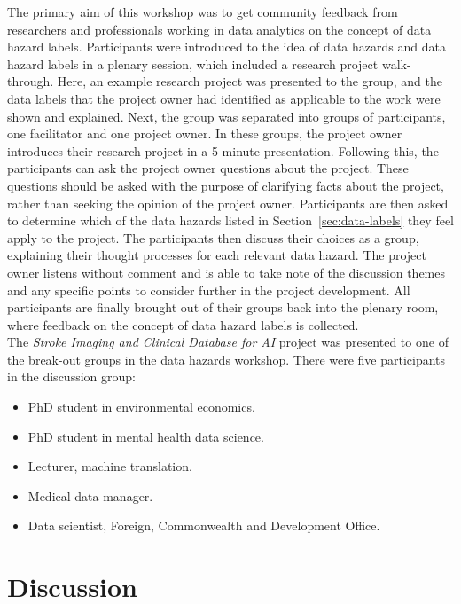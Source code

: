 \documentclass{article}
\begin{document}
The primary aim of this workshop was to get community feedback from
researchers and professionals working in data analytics on the concept
of data hazard labels.
Participants were introduced to the idea of data hazards and data
hazard labels in a plenary session, which included a research project
walk-through. Here, an example research project was presented to the
group, and the data labels that the project owner had identified as
applicable to the work were shown and explained.
Next, the group was separated into groups of participants, one
facilitator and one project owner.
In these groups, the project owner introduces their research project
in a 5 minute presentation. Following this, the participants can ask
the project owner questions about the project. These questions should
be asked with the purpose of clarifying facts about the project,
rather than seeking the opinion of the project owner.
Participants are then asked to determine which of the data hazards
listed in Section~\ref{sec:data-labels} they feel apply to the
project. The participants then discuss their choices as a group,
explaining their thought processes for each relevant data hazard.
The project owner listens without comment and is able to take note of
the discussion themes and any specific points to consider further in
the project development. All participants are finally brought out of
their groups back into the plenary room, where feedback on the concept
of data hazard labels is collected. \\

The \textit{Stroke Imaging and Clinical Database for AI} project was
presented to one of the break-out groups in the data hazards workshop.
There were five participants in the discussion group:

\begin{itemize}
\item PhD student in environmental economics.
\item PhD student in mental health data science.
\item Lecturer, machine translation.
\item Medical data manager.
\item Data scientist, Foreign, Commonwealth and Development Office.
\end{itemize}


\section{Discussion}
\end{document}
